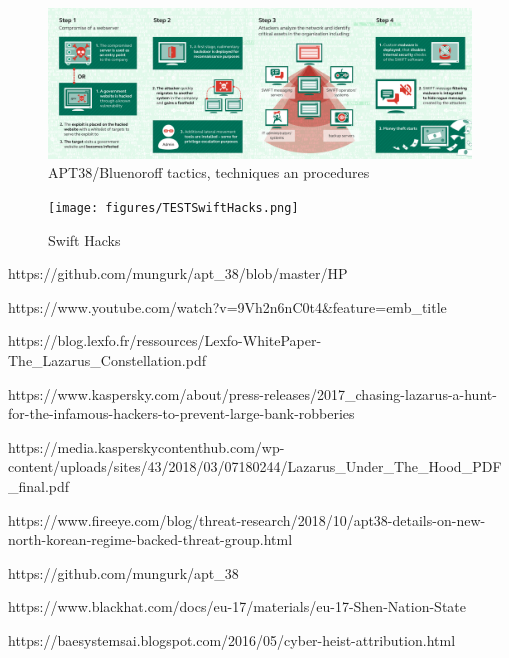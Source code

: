 \documentclass[12pt]{article}
\begin{document}
        \begin{figure}[H]
        \centering
        \includegraphics[width=\textwidth,cfbox=red 0.1mm 0.1mm]{figures/lazarus-tpp.png}
        \caption{APT38/Bluenoroff tactics, techniques an procedures}
        \label{fig:lazarus38}
        \end{figure}

        
        
        \begin{figure}[H]
        \centering
        \texttt{[image: figures/TESTSwiftHacks.png]}
        \caption{Swift Hacks}
        \label{fig:SwiftHacks}
        \end{figure}
        
        https://github.com/mungurk/apt_38/blob/master/HP%
        
        https://www.youtube.com/watch?v=9Vh2n6nC0t4&feature=emb_title
        
        https://blog.lexfo.fr/ressources/Lexfo-WhitePaper-The_Lazarus_Constellation.pdf
        
        https://www.kaspersky.com/about/press-releases/2017_chasing-lazarus-a-hunt-for-the-infamous-hackers-to-prevent-large-bank-robberies
        
        https://media.kasperskycontenthub.com/wp-content/uploads/sites/43/2018/03/07180244/Lazarus_Under_The_Hood_PDF_final.pdf
        
        https://www.fireeye.com/blog/threat-research/2018/10/apt38-details-on-new-north-korean-regime-backed-threat-group.html
        
        https://github.com/mungurk/apt_38
        
        https://www.blackhat.com/docs/eu-17/materials/eu-17-Shen-Nation-State%
        
        https://baesystemsai.blogspot.com/2016/05/cyber-heist-attribution.html
        
\end{document}
